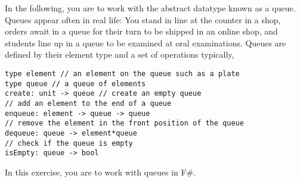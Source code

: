 In the following, you are to work with the abstract datatype known as a queue. Queues appear often in real life: You stand in line at the counter in a shop, orders await in a queue for their turn to be shipped in an online shop, and students line up in a queue to be examined at oral examinations. Queues are defined by their element type and a set of operations typically,
\begin{lstlisting}
type element // an element on the queue such as a plate
type queue // a queue of elements
create: unit -> queue // create an empty queue
// add an element to the end of a queue
enqueue: element -> queue -> queue
// remove the element in the front position of the queue
dequeue: queue -> element*queue
// check if the queue is empty
isEmpty: queue -> bool
\end{lstlisting}
In this exercise, you are to work with queues in F\#.